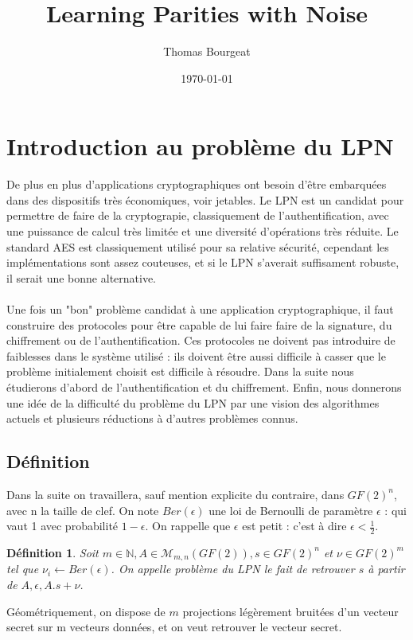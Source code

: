 \documentclass{article}		%
\newtheorem{defi}{Définition}
\theoremstyle{definition}
\theoremstyle{plain}
\begin{document}
\title{Learning Parities with Noise}
\author{Thomas Bourgeat }
\date\today
\maketitle
\section{Introduction au problème du LPN}
De plus en plus d'applications cryptographiques ont besoin d'être embarquées 
dans des dispositifs très économiques, voir jetables.  Le LPN est un candidat
pour permettre de faire de la cryptograpie, classiquement de
l'authentification, avec une puissance de calcul
très limitée et une diversité d'opérations très réduite.
Le standard AES est classiquement utilisé pour sa relative sécurité,
cependant les implémentations sont assez couteuses, et si le LPN s'averait suffisament
robuste, il serait une bonne alternative.
\\\\
Une fois un "bon" problème candidat à une application cryptographique, il
faut construire des protocoles pour être capable de lui faire faire de la
signature, du chiffrement ou de l'authentification. Ces protocoles ne
doivent pas introduire de faiblesses dans le système utilisé : ils doivent
être aussi difficile à casser que le problème initialement choisit est
difficile à résoudre.
Dans la suite nous  étudierons d'abord de l'authentification et du
chiffrement. Enfin, nous donnerons une idée de la difficulté du
problème du LPN par une vision des algorithmes actuels et plusieurs
réductions à d'autres problèmes connus.    
\subsection{Définition}
Dans la suite on travaillera, sauf mention explicite du contraire, dans
$GF(2)^n$, avec n la taille de clef. On note $Ber(\epsilon)$
une loi de Bernoulli de paramètre $\epsilon$ : qui vaut 1 avec
probabilité $1-\epsilon$. On rappelle que $\epsilon$ est petit : c'est à
dire $\epsilon < \frac {1}{2}$.  
\begin{defi}
Soit $m \in \mathbb{N}, A \in \mathcal{M}_{m,n}(GF(2)), s \in GF(2)^n$ et
$\nu \in GF(2)^m$ tel que $\nu_i \leftarrow Ber(\epsilon)$. On appelle
problème du LPN le fait de retrouver $s$ à partir de $A,\epsilon,
A.s+\nu$. 
\end{defi}
Géométriquement, on dispose de $m$ projections légèrement bruitées d'un vecteur secret sur m
vecteurs données, et on veut retrouver le vecteur secret.
\end{document}
